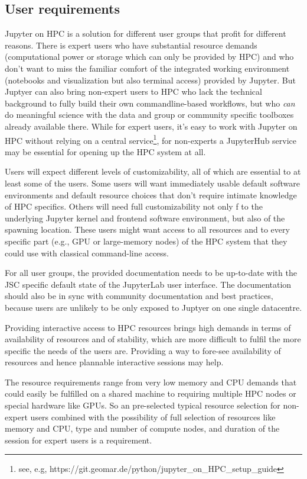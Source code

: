 \subsection{User requirements}

Jupyter on HPC is a solution for different user groups that profit for different reasons.
There is expert users who have substantial resource demands (computational power or storage which can only be provided by HPC) and who don't want to miss the familiar comfort of the integrated working environment (notebooks and visualization but also terminal access) provided by Jupyter.
But Juptyer can also bring non-expert users to HPC who lack the technical background to fully build their own commandline-based workflows, but who \emph{can} do meaningful science with the data and group or community specific toolboxes already available there.
While for expert users, it's easy to work with Jupyter on HPC without relying on a central service\footnote{see, e.g, https://git.geomar.de/python/jupyter_on_HPC_setup_guide}, for non-experts a JupyterHub service may be essential for opening up the HPC system at all.

Users will expect different levels of customizability, all of which are essential to at least some of the users.
Some users will want immediately usable default software environments and default resource choices that don't require intimate knowledge of HPC specifics.
Others will need full customizability not only f to the underlying Jupyter kernel and frontend software environment, but also of the spawning location.
These users might want access to all resources and to every specific part (e.g., GPU or large-memory nodes) of the HPC system that they could use with classical command-line access.

For all user groups, the provided documentation needs to be up-to-date with the JSC specific default state of the JupyterLab user interface.
The documentation should also be in sync with community documentation and best practices, because users are unlikely to be only exposed to Juptyer on one single datacentre.

Providing interactive access to HPC resources brings high demands in terms of availability of resources and of stability, which are more difficult to fulfil the more specific the needs of the users are.
Providing a way to fore-see availability of resources and hence plannable interactive sessions may help.

The resource requirements range from very low memory and CPU demands that could easily be fulfilled on a shared machine to requiring multiple HPC nodes or special hardware like GPUs.
So an pre-selected typical resource selection for non-expert users combined with the possibility of full selection of resources like memory and CPU, type and number of compute nodes, and duration of the session for expert users is a requirement.


